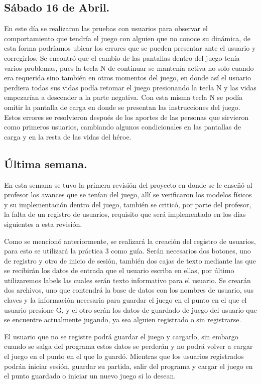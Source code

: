 \documentclass{article}
\begin{document}
\subsection{Sábado 16 de Abril.}
En este día se realizaron las pruebas con usuarios para observar el comportamiento que tendría el juego con alguien que no conoce su dinámica, de esta forma podríamos ubicar los errores que se pueden presentar ante el usuario y corregirlos.
Se encontró que el cambio de las pantallas dentro del juego tenía varios problemas, pues la tecla N de continuar se mantenía activa no solo cuando era requerida sino también en otros momentos del juego, en donde así el usuario perdiera todas sus vidas podía retomar el juego presionando la tecla N y las vidas empezarían a descender a la parte negativa. Con esta misma tecla N se podía omitir la pantalla de carga en donde se presentan las instrucciones del juego.
Estos errores se resolvieron después de los aportes de las personas que sirvieron como primeros usuarios, cambiando algunos condicionales en las pantallas de carga y en la resta de las vidas del héroe.

\subsection{Última semana.}
En esta semana se tuvo la primera revisión del proyecto en donde se le enseñó al profesor los avances que se tenían del juego, allí se verificaron los modelos físicos y su implementación dentro del juego, también se criticó, por parte del profesor, la falta de un registro de usuarios, requisito que será implementado en los días siguientes a esta revisión.

Como se mencionó anteriormente, se realizará la creación del registro de usuarios, para esto se utilizará la práctica 3 como guía. Serán necesarios dos botones, uno de registro y otro de inicio de sesión, también dos cajas de texto mediante las que se recibirán los datos de entrada que el usuario escriba en ellas, por último utilizaremos labels las cuales serán texto informativo para el usuario. Se crearán dos archivos, uno que contendrá la base de datos con los nombres de usuario, sus claves y la información necesaria para guardar el juego en el punto en el que el usuario presione G, y el otro serán los datos de guardado de juego del usuario que se encuentre actualmente jugando, ya sea alguien registrado o sin registrarse.

El usuario que no se registre podrá guardar el juego y cargarlo, sin embargo cuando se salga del programa estos datos se perderán y no podrá volver a cargar el juego en el punto en el que lo guardó. Mientras que los usuarios registrados podrán iniciar sesión, guardar su partida, salir del programa y cargar el juego en el punto guardado o iniciar un nuevo juego si lo desean.
\end{document}
